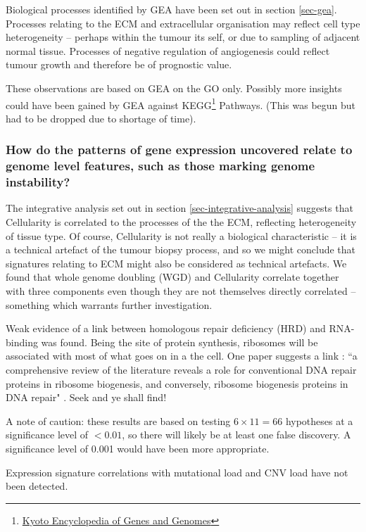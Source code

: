 \documentclass[tikz, 12pt,a4paper,oneside,fleqn]{article}
\begin{document}
Biological processes identified by GEA have been set out in section \ref{sec-gea}.   Processes relating to the ECM and extracellular organisation may reflect cell type heterogeneity -- perhaps within the tumour its self, or due to sampling of adjacent normal tissue.   Processes of negative regulation of angiogenesis could reflect tumour growth and therefore be of prognostic value.   

These observations are based on GEA on the GO only.  Possibly more insights could have been gained by GEA against KEGG\footnote{\href{https://www.genome.jp/kegg/pathway.html}{Kyoto Encyclopedia of Genes and Genomes}} Pathways. (This was begun but had to be dropped due to shortage of time).

\subsubsection*{How do the patterns of gene expression uncovered relate to genome level features, such as those marking genome instability?}

The integrative analysis set out in section \ref{sec-integrative-analysis} suggests that  Cellularity is correlated to the processes of the the ECM, reflecting heterogeneity of tissue type.   Of course, Cellularity is not really a biological characteristic -- it is a technical artefact of the tumour biopsy process, and so we might conclude that signatures relating to ECM might also be considered as technical artefacts.  We found that whole genome doubling (WGD) and Cellularity correlate together with three components even though they are not themselves directly correlated -- something which warrants further investigation.

Weak evidence of a link between homologous repair deficiency (HRD) and RNA-binding was found.   Being the site of protein synthesis, ribosomes will be associated with most of what goes on in a the cell.   One paper suggests a link : ``a comprehensive review of the literature reveals a role for conventional DNA repair proteins in ribosome biogenesis, and conversely, ribosome biogenesis proteins in DNA repair" \cite{Ogawa2018}.   Seek and ye shall find!

A note of caution: these results are based on testing $6 \times 11 = 66$ hypotheses at a significance level of $< 0.01$, so there will likely be at least one false discovery.  A significance level of 0.001 would have been more appropriate.

Expression signature correlations with mutational load and  CNV load have not been detected.  
\end{document}
